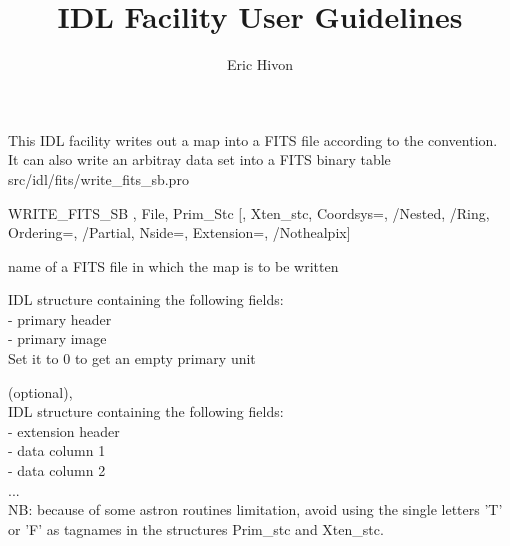 




\renewcommand{\facname}{{write\_fits\_sb }}
\renewcommand{\FACNAME}{{WRITE\_FITS\_SB }}
\sloppy



\title{\healpix IDL Facility User Guidelines}
 \section[write\_fits\_sb]{ }
\label{idl:write_fits_sb}
\author{Eric Hivon}




\begin{facility}
{This IDL facility writes out a \healpix map into a FITS file according to
the \healpix convention. It can also write an arbitray data set into a FITS
binary table}
{src/idl/fits/write\_fits\_sb.pro}
\end{facility}

\begin{IDLformat}
{\FACNAME, File, Prim\_Stc [, Xten\_stc, Coordsys=, /Nested, /Ring,
Ordering=, /Partial, Nside=, Extension=, /Nothealpix]
}
\end{IDLformat}

\begin{qualifiers}
  \begin{qulist}{} %
 	\item[{File}] 
          name of a FITS file in which the map is to be written

 	\item[{Prim\_stc}] 
	IDL structure containing the following fields: \\
		- primary header \\
		- primary image \\
	Set it to 0 to get an empty primary unit

       \item[{Xten\_stc}]
		  (optional), \\
	IDL structure containing the following fields: \\
		- extension header  \\
		- data column 1  \\
		- data column 2   \\
		... \\
	NB: because of some astron routines limitation, avoid using the single letters
		  'T' or 'F' as tagnames in the structures Prim\_stc and Xten\_stc.

  \end{qulist}
\end{qualifiers}

